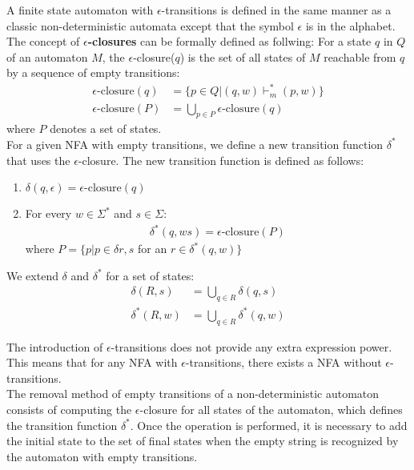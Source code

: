 A finite state automaton with $\epsilon$-transitions is defined 
in the same manner as a classic non-deterministic automata except that the
symbol $\epsilon$ is in the alphabet.\\

The concept of \textbf{$\epsilon$-closures} can be formally defined as follwing: For a state $q$ in $Q$ of an automaton $M$, the
$\epsilon$-closure($q$) is the set of all states of $M$
reachable from $q$ by a sequence of empty transitions:
\begin{align*}
  \epsilon\text{-closure}(q) & = \{p \in Q \vert (q,w) \vdash_m^{*}(p,w)\}\\
  \epsilon\text{-closure}(P) & = \bigcup_{p\in P} \epsilon\text{-closure}(q)
\end{align*}
where $P$ denotes a set of states.\\

For a given NFA with empty transitions,
we define a new transition function $\delta^{*}$
that uses the $\epsilon$-closure.
The new transition function is defined as follows:
\begin{enumerate}
  \item $\delta(q, \epsilon) = \epsilon\text{-closure}(q)$
  \item For every $w \in \Sigma^{*}$ and $s \in \Sigma$:
  \begin{align*}
    \delta^{*}(q, ws) = \epsilon\text{-closure}(P)
  \end{align*}
  where $P = \{p \vert p \in \delta{r, s}$ for an $r \in \delta^{*}(q,w)\}$
\end{enumerate}

We extend $\delta$ and $\delta^{*}$ for a set of states:
\begin{align*}
  \delta(R, s) & = \bigcup_{q \in R} \delta(q, s)\\
  \delta^{*}(R,w) & = \bigcup_{q \in R} \delta^{*}(q, w)
\end{align*}

The introduction of $\epsilon$-transitions
does not provide any extra expression power.
This means that for any NFA with $\epsilon$-transitions,
there exists a NFA without $\epsilon$-transitions.\\

The removal method of empty transitions of a non-deterministic
automaton consists of computing the $\epsilon$-closure for all states
of the automaton, which defines the transition function $\delta^{*}$.
Once the operation is performed, it is necessary to add the initial state
to the set of final states when the empty string is recognized
by the automaton with empty transitions.\\


